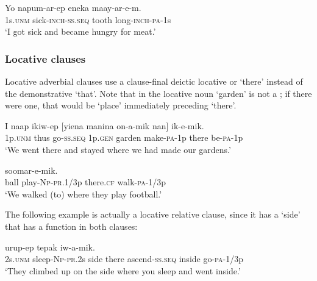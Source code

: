 \ea%
\label{ex:8:x1632}
\gll Yo  napum-ar-ep  eneka  maay-ar-e-m.\\
1s.\textsc{unm} sick-\textsc{inch}-\textsc{ss}.\textsc{seq} tooth  long-\textsc{inch}-\textsc{pa}-1s\\
\glt`I got sick and became hungry for meat.'
\z


\subsubsection{Locative clauses} \label{sec:8.3.3.2}

Locative adverbial clauses use a clause-final deictic locative  or  `there' instead of the demonstrative   `that'. Note that in  the locative noun  `garden' is not a ; if there were one, that would be  `place' immediately preceding  `there'. 

\ea%
\label{ex:8:x1621}
\gll I  naap  ikiw-ep  [yiena  manina  on-a-mik  nan] ik-e-mik.\\
1p.\textsc{unm} thus  go-\textsc{ss}.\textsc{seq} 1p.\textsc{gen} garden  make-\textsc{pa}-1p  there be-\textsc{pa}-1p\\
\glt`We went there and stayed where we had made our gardens.'
\z


\ea%
\label{ex:8:x1626}
  soomar-e-mik.\\
ball  play-\textsc{Np}-\textsc{pr}.1/3p there.\textsc{cf} walk-\textsc{pa}-1/3p\\
\glt`We walked (to) where they play football.'
\z


The following example is actually a locative relative clause, since it has a   `side' that has a function in both clauses:

\ea%
\label{ex:8:x1638}
  urup-ep  tepak  iw-a-mik. \\
2s.\textsc{unm} sleep-\textsc{Np}-\textsc{pr}.2s side there ascend-\textsc{ss}.\textsc{seq} inside go-\textsc{pa}-1/3p\\
\glt`They climbed up on the side where you sleep and went inside.'
\z


